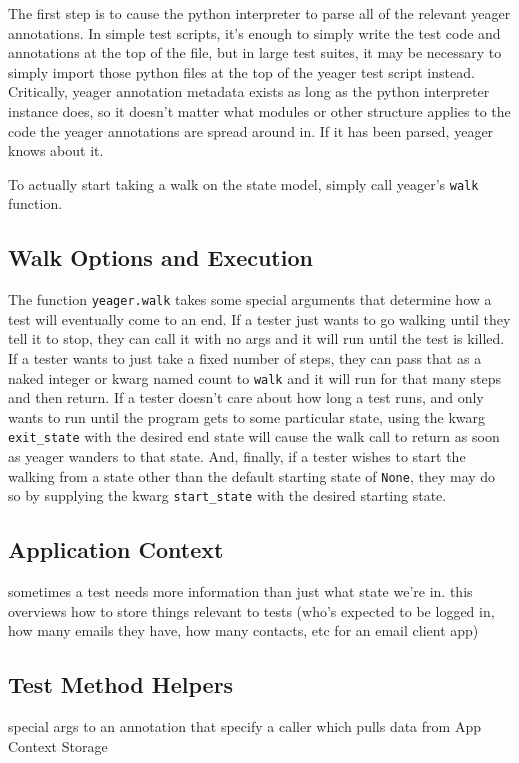 The first step is to cause the python interpreter to parse all of the relevant yeager annotations. In simple test scripts, it's enough to simply write the test code and annotations at the top of the file, but in large test suites, it may be necessary to simply import those python files at the top of the yeager test script instead. Critically, yeager annotation metadata exists as long as the python interpreter instance does, so it doesn't matter what modules or other structure applies to the code the yeager annotations are spread around in. If it has been parsed, yeager knows about it.

To actually start taking a walk on the state model, simply call yeager's \texttt{walk} function.

\subsection{Walk Options and Execution}
The function \texttt{yeager.walk} takes some special arguments that determine how a test will eventually come to an end. If a tester just wants to go walking until they tell it to stop, they can call it with no args and it will run until the test is killed. If a tester wants to just take a fixed number of steps, they can pass that as a naked integer or kwarg named count to \texttt{walk} and it will run for that many steps and then return. If a tester doesn't care about how long a test runs, and only wants to run until the program gets to some particular state, using the kwarg \texttt{exit\_state} with the desired end state will cause the walk call to return as soon as yeager wanders to that state. And, finally, if a tester wishes to start the walking from a state other than the default starting state of \texttt{None}, they may do so by supplying the kwarg \texttt{start\_state} with the desired starting state.

\subsection{Application Context}
sometimes a test needs more information than just what state we're in. this overviews how to store things relevant to tests (who's expected to be logged in, how many emails they have, how many contacts, etc for an email client app) %

\subsection{Test Method Helpers}
special args to an annotation that specify a caller which pulls data from App Context Storage %

